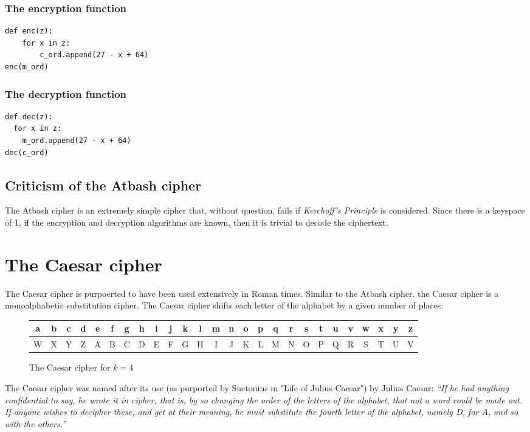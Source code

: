 \documentclass{AIAA}
\begin{document}
\subsubsection{The encryption function}
\begin{verbatim}
def enc(z):
    for x in z:
        c_ord.append(27 - x + 64)
enc(m_ord)
\end{verbatim}

\subsubsection{The decryption function}
\begin{verbatim}
def dec(z):
  for x in z:
    m_ord.append(27 - x + 64)
dec(c_ord)
\end{verbatim}

\subsection{Criticism of the Atbash cipher}
The Atbash cipher is an extremely simple cipher that, without question, fails if \textit{Kerchoff's Principle} is considered. Since there is a keyspace of 1, if the encryption and decryption algorithms are known, then it is trivial to decode the ciphertext. 

\section{The Caesar cipher}
The Caesar cipher is purpoerted to have been used extensively in Roman times. Similar to the Atbash cipher, the Caesar cipher is a monoalphabetic substitution cipher. The Caesar cipher shifts each letter of the alphabet by a given number of places:

\begin{figure}[h!]
\begin{tabular}{|c|c|c|c|c|c|c|c|c|c|c|c|c|c|c|c|c|c|c|c|c|c|c|c|c|c|}
\hline
a & b & c & d & e & f & g & h & i & j & k & l & m & n & o & p & q & r & s & t & u & v & w & x & y & z \\ \hline
W & X & Y & Z & A & B & C & D & E & F & G & H & I & J & K & L & M & N & O & P & Q & R & S & T & U & V \\
\hline
\end{tabular}
\caption{The Caesar cipher for $k=4$}
\end{figure}
The Caesar cipher was named after its use (as purported by Suetonius in "Life of Julius Caesar") by Julius Caesar: \textit{``If he had anything confidential to say, he wrote it in cipher, that is, by so changing the order of the letters of the alphabet, that not a word could be made out. If anyone wishes to decipher these, and get at their meaning, he must substitute the fourth letter of the alphabet, namely D, for A, and so with the others.''} 
\end{document}
